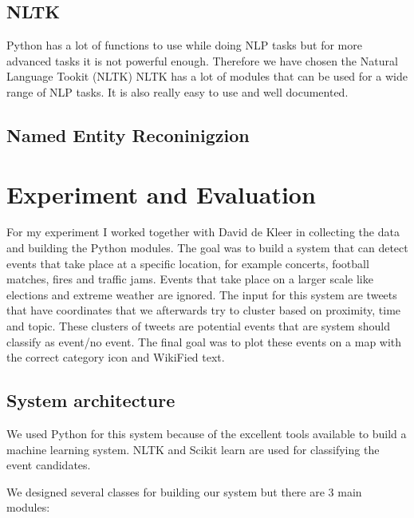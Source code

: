 \documentclass[
10pt, %
a4paper, %
oneside, %
headinclude,footinclude, %
BCOR5mm, %
]{scrartcl}
\begin{document}
\subsection{NLTK}
Python has a lot of functions to use while doing NLP tasks but for more advanced tasks it is not powerful enough. Therefore we have chosen the Natural Language Tookit (NLTK) %
NLTK has a lot of modules that can be used for a wide range of NLP tasks. It is also really easy to use and well documented. 




\subsection{Named Entity Reconinigzion}
\lipsum[10] %



\section{Experiment and Evaluation}
For my experiment I worked together with David de Kleer in collecting the data and building the Python modules. The goal was to build a system that can detect events that take place at a specific location, for example concerts, football matches, fires and traffic jams.  Events that take place on a larger scale like elections and extreme weather are ignored. The input for this system are tweets that have coordinates that we afterwards try to cluster based on proximity, time and topic. These clusters of tweets are potential events that are system should classify as event/no event. The final goal was to plot these events on a map with the correct category icon and WikiFied text. 

\subsection{System architecture}
We used Python for this system because of the excellent tools available to build a machine learning system. NLTK and Scikit learn are used for classifying the event candidates.

We designed several classes for building our system but there are 3 main modules:
\end{document}
